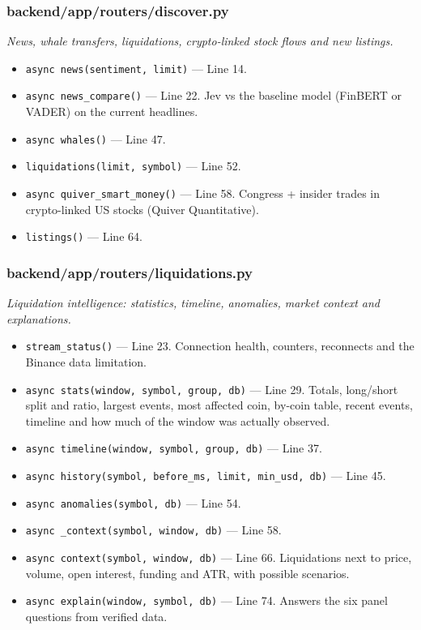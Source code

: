 \subsubsection*{backend/app/routers/discover.py}
\textit{News, whale transfers, liquidations, crypto-linked stock flows and new listings.}
\begin{itemize}[nosep,leftmargin=1.5em]
\item \texttt{async news(\allowbreak{}sentiment,\allowbreak{} limit)} --- Line 14.
\item \texttt{async news\_\allowbreak{}compare(\allowbreak{})} --- Line 22. Jev vs the baseline model (FinBERT or VADER) on the current headlines.
\item \texttt{async whales(\allowbreak{})} --- Line 47.
\item \texttt{liquidations(\allowbreak{}limit,\allowbreak{} symbol)} --- Line 52.
\item \texttt{async quiver\_\allowbreak{}smart\_\allowbreak{}money(\allowbreak{})} --- Line 58. Congress + insider trades in crypto-linked US stocks (Quiver Quantitative).
\item \texttt{listings(\allowbreak{})} --- Line 64.
\end{itemize}
\subsubsection*{backend/app/routers/liquidations.py}
\textit{Liquidation intelligence: statistics, timeline, anomalies, market context and explanations.}
\begin{itemize}[nosep,leftmargin=1.5em]
\item \texttt{stream\_\allowbreak{}status(\allowbreak{})} --- Line 23. Connection health, counters, reconnects and the Binance data limitation.
\item \texttt{async stats(\allowbreak{}window,\allowbreak{} symbol,\allowbreak{} group,\allowbreak{} db)} --- Line 29. Totals, long/short split and ratio, largest events, most affected coin, by-coin table, recent events, timeline and how much of the window was actually observed.
\item \texttt{async timeline(\allowbreak{}window,\allowbreak{} symbol,\allowbreak{} group,\allowbreak{} db)} --- Line 37.
\item \texttt{async history(\allowbreak{}symbol,\allowbreak{} before\_\allowbreak{}ms,\allowbreak{} limit,\allowbreak{} min\_\allowbreak{}usd,\allowbreak{} db)} --- Line 45.
\item \texttt{async anomalies(\allowbreak{}symbol,\allowbreak{} db)} --- Line 54.
\item \texttt{async \_\allowbreak{}context(\allowbreak{}symbol,\allowbreak{} window,\allowbreak{} db)} --- Line 58.
\item \texttt{async context(\allowbreak{}symbol,\allowbreak{} window,\allowbreak{} db)} --- Line 66. Liquidations next to price, volume, open interest, funding and ATR, with possible scenarios.
\item \texttt{async explain(\allowbreak{}window,\allowbreak{} symbol,\allowbreak{} db)} --- Line 74. Answers the six panel questions from verified data.
\end{itemize}
